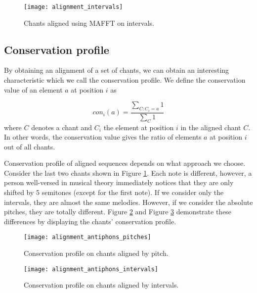 \begin{figure}[h]
\centering
\texttt{[image: alignment\_intervals]}
\caption{Chants aligned using MAFFT on intervals.}
\label{fig:align_intervals}
\end{figure}

\subsection{Conservation profile}

By obtaining an alignment of a set of chants, we can obtain an interesting characteristic which we call the conservation profile. We define the conservation value
of an element $a$ at position $i$ as 

\[
    con_i(a) = \frac{\sum_{C: C_i = a} 1}{\sum_C 1}
\]
where $C$ denotes a chant and $C_i$ the element at position $i$ in the aligned chant $C$. In other words, the conservation value gives the ratio of elements $a$
at position $i$ out of all chants.

Conservation profile of aligned sequences depends on what approach we choose. Consider the last two chants shown in Figure \ref{fig:align_intervals}. Each note
is different, however, a person well-versed in musical theory immediately notices that they are only shifted by 5 semitones (except for the first note). If we consider only
the intervals, they are almost the same melodies. However, if we consider the absolute pitches, they are totally different. Figure \ref{fig:cons_pitch}
and Figure \ref{fig:cons_intervals} demonstrate these differences by displaying the chants' conservation profile.

\begin{figure}[h]
\centering
\texttt{[image: alignment\_antiphons\_pitches]}
\caption{Conservation profile on chants aligned by pitch.}
\label{fig:cons_pitch}
\end{figure}

\begin{figure}[h]
\centering
\texttt{[image: alignment\_antiphons\_intervals]}
\caption{Conservation profile on chants aligned by intervals.}
\label{fig:cons_intervals}
\end{figure}
